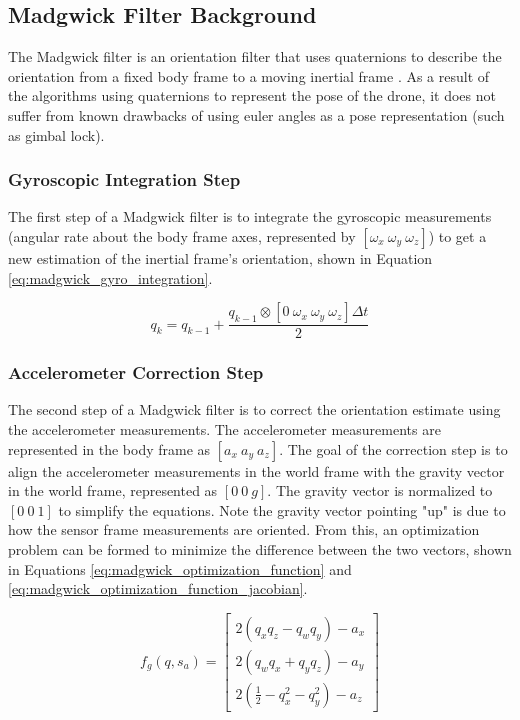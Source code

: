 \documentclass[bare_jrnl_transmag]{subfiles}
\begin{document}
\subsection{Madgwick Filter Background}
The Madgwick filter is an orientation filter that uses quaternions to describe the orientation from a fixed body frame to a moving inertial frame \cite{ahrs_madgwick}. As a result of the algorithms using quaternions to represent the pose of the drone, it does not suffer from known drawbacks of using euler angles as a pose representation (such as gimbal lock).

\subsubsection{Gyroscopic Integration Step}
The first step of a Madgwick filter is to integrate the gyroscopic measurements (angular rate about the body frame axes, represented by $[\omega_x \ \omega_y \ \omega_z]$) to get a new estimation of the inertial frame's orientation, shown in Equation \ref{eq:madgwick_gyro_integration}.

\begin{equation}
    q_{k} = q_{k-1} + \frac{q_{k-1} \otimes [0 \ \omega_x \ \omega_y \ \omega_z] \Delta t}{2}
    \label{eq:madgwick_gyro_integration}
\end{equation}

\subsubsection{Accelerometer Correction Step}
The second step of a Madgwick filter is to correct the orientation estimate using the accelerometer measurements. The accelerometer measurements are represented in the body frame as $[a_x \ a_y \ a_z]$. The goal of the correction step is to align the accelerometer measurements in the world frame with the gravity vector in the world frame, represented as $[0 \ 0 \ g]$. The gravity vector is normalized to $[0 \ 0 \ 1]$ to simplify the equations. Note the gravity vector pointing "up" is due to how the sensor frame measurements are oriented. From this, an optimization problem can be formed to minimize the difference between the two vectors, shown in Equations \ref{eq:madgwick_optimization_function} and \ref{eq:madgwick_optimization_function_jacobian}.

\begin{equation}
f_g(q, s_a) =
\begin{bmatrix}
    2(q_x q_z - q_w q_y) - a_x \\
    2(q_w q_x + q_y q_z) - a_y \\
    2\left(\frac{1}{2} - q_x^2 - q_y^2\right) - a_z
    \end{bmatrix}
    \label{eq:madgwick_optimization_function}
\end{equation}
    
\end{document}
